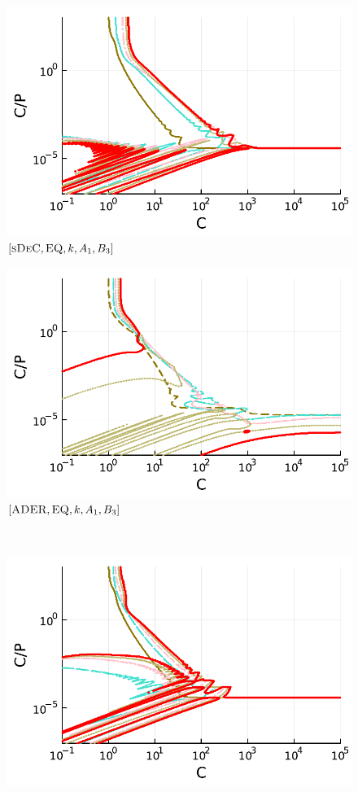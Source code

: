 \begin{figure}
\begin{minipage}[t]{0.32\textwidth}
		\includegraphics[width=\textwidth]{pdf/pdepics/disp/IMEXDeC_subtimesteps_equispaced_disp_TMM_2-6_newE.pdf}
		\small$[\textsc{sDeC}, \textsc{EQ},k, A_1,B_3]$\par
	\end{minipage}
	\begin{minipage}[t]{0.32\textwidth}
		\centering
		\includegraphics[width=\textwidth]{pdf/pdepics/disp/IMEXADER_equispaced_disp_TMM_2-6_newE.pdf}
		\small$[\textsc{ADER}, \textsc{EQ},k, A_1,B_3]$\par
	\end{minipage}\\
	\begin{minipage}[t]{0.32\textwidth}
		\centering
		\includegraphics[width=\textwidth]{pdf/pdepics/disp/IMEXDeC_gaussLobatto_disp_TMM_2-6_newE.pdf}

\end{minipage}
\end{figure}
